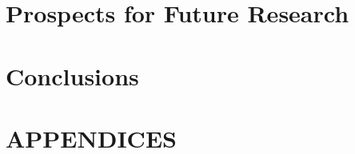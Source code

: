 \documentclass[letterpaper,12pt,titlepage,oneside,final]{report}
\newcommand{\href}[1]{#1} %
\begin{document}




\chapter{Prospects for Future Research}


\chapter{Conclusions}

\appendix
\chapter*{APPENDICES}



\end{document}
